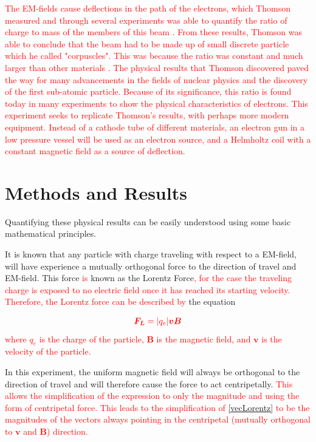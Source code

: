 \documentclass[%
 reprint,
 amsmath,amssymb,
 aps,
]{revtex4-2}
\begin{document}
\textcolor{red}{The EM-fields cause deflections in the path of the electrons, which Thomson measured and through several experiments was able to quantify the ratio of charge to mass of the members of this beam \cite{Thomson01022010}. From these results, Thomson was able to conclude that the beam had to be made up of small discrete particle which he called "corpuscles". This was because the ratio was constant and much larger than other materials \cite{Thomson01022010}. The physical results that Thomson discovered paved the way for many advancements in the fields of nuclear physics and the discovery of the first sub-atomic particle. Because of its significance, this ratio is found today in many experiments to show the physical characteristics of electrons. This experiment seeks to replicate Thomson's results, with perhaps more modern equipment. Instead of a cathode tube of different materials, an electron gun in a low pressure vessel will be used as an electron source, and a Helmholtz coil with a constant magnetic field as a source of deflection.}

\section{Methods and Results}
Quantifying these physical results can be easily understood using some basic mathematical principles. 

It is known that any particle with charge traveling with respect to a EM-field, will have experience a mutually orthogonal force to the direction of travel and EM-field. This force \textcolor{red}{is} known as the Lorentz Force\textcolor{red}{, for the case the traveling charge is exposed to no electric field once it has reached its starting velocity. Therefore, the Lorentz force can be described by} the equation

\begin{align}
     \textcolor{red}{\boldsymbol{F_L} = |q_e|\boldsymbol{v}\boldsymbol{B}}
     \label{vecLorentz}
\end{align}
\textcolor{red}{where $q_e$ is the charge of the particle, $\boldsymbol{B}$ is the magnetic field, and $\boldsymbol{v}$ is the velocity of the particle.}

In this experiment, the uniform magnetic field will always be orthogonal to the direction of travel and will therefore cause the force to act centripetally. 
\textcolor{red}{This allows the simplification of the expression to only the magnitude and using the form of centripetal force. This leads to the simplification of \eqref{vecLorentz} to be the magnitudes of the vectors always pointing in the centripetal (mutually orthogonal to $\boldsymbol{v}$ and $\boldsymbol{B}$) direction.}
\end{document}
